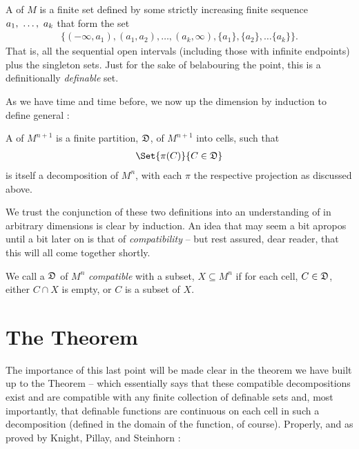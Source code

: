 \begin{definition}[\CD \emph{of $M$}]
  A \emph{\cd} of $M$ is a finite set defined by some strictly increasing finite sequence $a_1, \ \hdots, \ a_k$ that form the set
  \begin{align*}
    \{(- \infty, a_1), (a_1, a_2), \hdots, (a_k, \infty), \{a_1\}, \{a_2\}, \hdots \{a_k\} \}.
  \end{align*}
  That is, all the sequential open intervals (including those with infinite endpoints) plus the singleton sets. Just for the sake of belabouring the point, this is a definitionally \emph{definable} set.
\end{definition}

As we have time and time before, we now up the dimension by induction to define general \cds:

\begin{definition}[\CD \emph{of $M^{n+1}$}]
  A \cd of $M^{n+1}$ is a finite partition, $\mathfrak{D}$, of $M^{n+1}$ into cells, such that
  \begin{align*}
    \Set{\pi (C)}{C \in \fancyD}
  \end{align*}
  is itself a decomposition of $M^n$, with each $\pi$ the respective projection as discussed above.
\end{definition}


We trust the conjunction of these two definitions into an understanding of \cds in arbitrary dimensions is clear by induction.
An idea that may seem a bit apropos until a bit later on is that of \emph{compatibility} -- but rest assured, dear reader, that this will all come together shortly.

\begin{definition}[Compatibility]
  We call a \cd $\mathfrak{D}$ of $M^n$ \emph{compatible} with a subset, $X \subseteq M^n$ if for each cell, $C \in \mathfrak{D}$, either $C \cap X$ is empty, or $C$ is a subset of $X$.
\end{definition}


\section{The \CD Theorem}

The importance of this last point will be made clear in the theorem we have built up to the \CD Theorem -- which essentially says that these compatible decompositions exist and are compatible with any finite collection of definable sets and, most importantly, that definable functions are continuous on each cell in such a decomposition (defined in the domain of the function, of course). Properly, and as proved by Knight, Pillay, and Steinhorn \cite{knight_definable_1986}:

